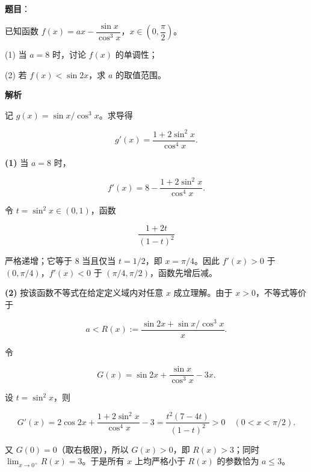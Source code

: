 \begin{answer}

\textbf{题目}：

已知函数 $f(x)=ax-\dfrac{\sin x}{\cos^3x}$，$x\in\left(0,\dfrac\pi2\right)$。

  (1) 当 $a=8$ 时，讨论 $f(x)$ 的单调性；

  (2) 若 $f(x)<\sin2x$，求 $a$ 的取值范围。

\textbf{解析}

记 $g(x)=\sin x/\cos^3x$。求导得

\nopagebreak[4]
\[
g'(x)=\frac{1+2\sin^2x}{\cos^4x}.
\]

\textbf{(1)} 当 $a=8$ 时，

\nopagebreak[4]
\[
f'(x)=8-\frac{1+2\sin^2x}{\cos^4x}.
\]

令 $t=\sin^2x\in(0,1)$，函数

\nopagebreak[4]
\[
\frac{1+2t}{(1-t)^2}
\]

严格递增；它等于 $8$ 当且仅当 $t=1/2$，即 $x=\pi/4$。因此 $f'(x)>0$ 于 $(0,\pi/4)$，$f'(x)<0$ 于 $(\pi/4,\pi/2)$，函数先增后减。

\textbf{(2)} 按该函数不等式在给定定义域内对任意 $x$ 成立理解。由于 $x>0$，不等式等价于

\nopagebreak[4]
\[
a<R(x):=\frac{\sin2x+\sin x/\cos^3x}{x}.
\]

令

\nopagebreak[4]
\[
G(x)=\sin2x+\frac{\sin x}{\cos^3x}-3x.
\]

设 $t=\sin^2x$，则

\nopagebreak[4]
\[
G'(x)=2\cos2x+\frac{1+2\sin^2x}{\cos^4x}-3
=\frac{t^2(7-4t)}{(1-t)^2}>0
\quad(0<x<\pi/2).
\]


又 $G(0)=0$（取右极限），所以 $G(x)>0$，即 $R(x)>3$；同时 $\lim_{x\to0^+}R(x)=3$。于是所有 $x$ 上均严格小于 $R(x)$ 的参数恰为 $a\leqslant3$。



\end{answer}
